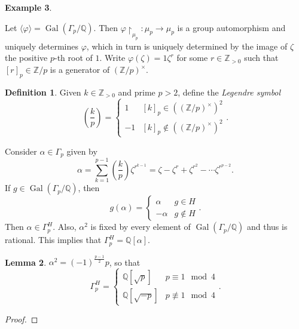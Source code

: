 \documentclass[10pt,letterpaper,cm]{nupset}
\theoremstyle{definition}
\newtheorem{definition}{Definition}[subsection]
\newtheorem{exmp}[definition]{Example}
\theoremstyle{theorem}
\newtheorem{lemma}[definition]{Lemma}
\theoremstyle{remark}
\newcommand{\Q}{\mathbb Q}
\newcommand{\Z}{\mathbb Z}
\newcommand{\1}{\mathbf{1}}
\newcommand{\0}{\vec 0}
\DeclareMathOperator{\gal}{Gal}
\begin{document}
\begin{exmp}
\begin{enumerate}
Let $\langle \varphi \rangle = \gal(\Gamma_p /\Q)$. Then $\varphi \restriction_{\mu_p} : \mu_p \to \mu_p$ is a group automorphism and  uniquely determines $\varphi$, which in turn is uniquely determined by the image of $\zeta$ the positive $p$-th root of $1$. Write $\varphi(\zeta) = 1\zeta^r$ for some $r \in \Z_{>0}$ such that $[r]_p \in \Z/p$ is a generator of $(\Z/p)^{\times}$. 
\begin{definition}
Given $k \in \Z_{>0}$ and prime $p>2$, define the \textit{Legendre symbol} $$\left(\frac{k}{p} \right) = \begin{cases}    1 & [k]_p \in ((\Z/p)^{\times})^2 \\ {-}1 & [k]_p \notin  ((\Z/p)^{\times})^2  \end{cases}.$$
\end{definition}
Consider $\alpha \in \Gamma_p$ given by $$  \alpha = \sum_{k=1}^{p-1} \left(\frac{k}{p} \right) \zeta^{r^{k-1}} = \zeta - \zeta^r + \zeta^{r^2} - \cdots \zeta^{r^{p-2}}   .$$ If $g\in \gal(\Gamma_p /\Q)$, then $$ g(\alpha) = \begin{cases}  \alpha & g \in H \\ {-}\alpha & g \notin H   \end{cases} . $$ Then $\alpha \in \Gamma_p^H$. Also, $\alpha^2$ is fixed by every element of $\gal(\Gamma_p/\Q)$ and thus is rational. This implies that $\Gamma_p^H = \Q[\alpha]$.
\begin{lemma}\label{l16}
$\alpha^2 = ({-}1)^{\frac{p-1}{2}}p$, so that $$\Gamma_p^H = \begin{cases} \Q[\sqrt{p}] & p \equiv 1 \mod 4 \\ \Q[\sqrt{{-}p}] & p \not \equiv 1 \mod 4   \end{cases}.$$
\end{lemma}
\begin{proof}

\end{proof}
\end{enumerate}
\end{exmp}
\end{document}
